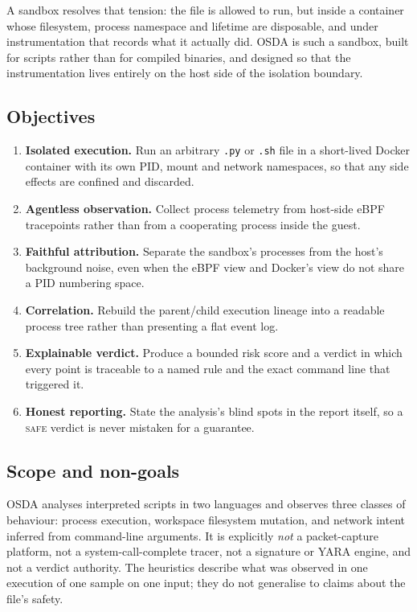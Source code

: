 \documentclass[11pt,a4paper]{article}
\newcommand{\code}[1]{\texttt{\small #1}}
\begin{document}
A sandbox resolves that tension: the file is allowed to run, but inside a container
whose filesystem, process namespace and lifetime are disposable, and under
instrumentation that records what it actually did. OSDA is such a sandbox, built
for scripts rather than for compiled binaries, and designed so that the
instrumentation lives entirely on the host side of the isolation boundary.

\subsection{Objectives}
\begin{enumerate}[leftmargin=*]
  \item \textbf{Isolated execution.} Run an arbitrary \code{.py} or \code{.sh} file
        in a short-lived Docker container with its own PID, mount and network
        namespaces, so that any side effects are confined and discarded.
  \item \textbf{Agentless observation.} Collect process telemetry from host-side
        eBPF tracepoints rather than from a cooperating process inside the guest.
  \item \textbf{Faithful attribution.} Separate the sandbox's processes from the
        host's background noise, even when the eBPF view and Docker's view do not
        share a PID numbering space.
  \item \textbf{Correlation.} Rebuild the parent/child execution lineage into a
        readable process tree rather than presenting a flat event log.
  \item \textbf{Explainable verdict.} Produce a bounded risk score and a verdict in
        which every point is traceable to a named rule and the exact command line
        that triggered it.
  \item \textbf{Honest reporting.} State the analysis's blind spots in the report
        itself, so a \textsc{safe} verdict is never mistaken for a guarantee.
\end{enumerate}

\subsection{Scope and non-goals}
OSDA analyses interpreted scripts in two languages and observes three classes of
behaviour: process execution, workspace filesystem mutation, and network intent
inferred from command-line arguments. It is explicitly \emph{not} a packet-capture
platform, not a system-call-complete tracer, not a signature or YARA engine, and
not a verdict authority. The heuristics describe what was observed in one execution
of one sample on one input; they do not generalise to claims about the file's safety.
\end{document}
